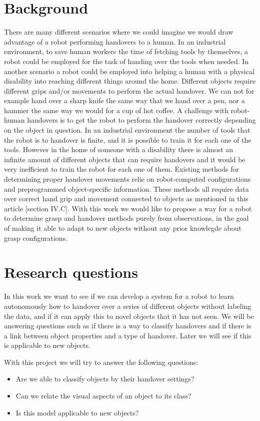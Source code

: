 \section{Background}

There are many different scenarios where we could imagine we would draw advantage of a robot performing handovers to a human. In an industrial environment, to save human workers the time of fetching tools by themselves, a robot could be employed for the task of handing over the tools when needed. In another scenario a robot could be employed into helping a human with a physical disability into reaching different things around the home. Different objects require different grips and/or movements to perform the actual handover. We can not for example hand over a sharp knife the same way that we hand over a pen, nor a hammer the same way we would for a cup of hot coffee. A challenge with robot-human handovers is to get the robot to perform the handover correctly depending on the object in question. In an industrial environment the number of tools that the robot is to handover is finite, and it is possible to train it for each one of the tools. However in the home of someone with a disability there is almost an infinite amount of different objects that can require handovers and it would be very inefficient to train the robot for each one of them. Existing methods for determining proper handover movements relie on robot-computed configurations and preprogrammed object-specific information. These methods all require data over correct hand grip and movement connected to objects as mentioned in this article [section IV.C]. With this work we would like to propose a way for a robot to determine grasp and handover methods purely from observations, in the goal of making it able to adapt to new objects without any prior knowlegde about grasp configurations.

\section{Research questions}
\label{sec:research_questions}

In this work we want to see if we can develop a system for a robot to learn autonomously how to handover over a series of different objects without labeling the data, and if it can apply this to novel objects that it has not seen. We will be answering questions such as if there is a way to classify handovers and if there is a link between object properties and a type of handover. Later we will see if this is applicable to new objects.

With this project we will try to answer the following questions:
\begin{itemize}
	\item Are we able to classify objects by their handover settings?
	\item Can we relate the visual aspects of an object to its class?
	\item Is this model applicable to new objects?
\end{itemize}
